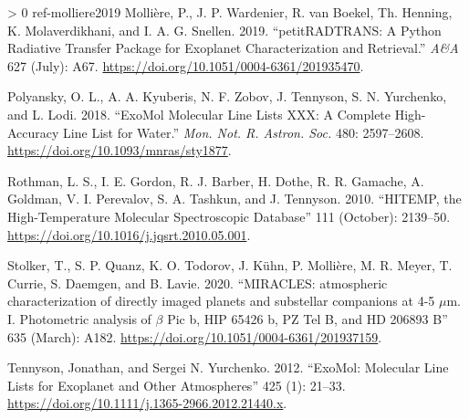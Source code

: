 \documentclass[10pt,a4paper,onecolumn]{article}
\newlength{\cslhangindent}
\newenvironment{CSLReferences}[3] %
 {%
  \setlength{\parindent}{0pt}
  \ifodd #1 \everypar{\setlength{\hangindent}{\cslhangindent}}\ignorespaces\fi
  \ifnum #2 > 0
  \setlength{\parskip}{#2\baselineskip}
  \fi
 }%
 {}
\begin{document}
\begin{CSLReferences}{1}{0}
\hypertarget{ref-molliere2019}{}%
Mollière, P., J. P. Wardenier, R. van Boekel, Th. Henning, K.
Molaverdikhani, and I. A. G. Snellen. 2019. {``{petitRADTRANS}: {A}
{Python} Radiative Transfer Package for Exoplanet Characterization and
Retrieval.''} \emph{A\&A} 627 (July): A67.
\url{https://doi.org/10.1051/0004-6361/201935470}.

\hypertarget{ref-polyansky2018}{}%
Polyansky, O. L., A. A. Kyuberis, N. F. Zobov, J. Tennyson, S. N.
Yurchenko, and L. Lodi. 2018. {``{ExoMol} Molecular Line Lists {XXX}: A
Complete High-Accuracy Line List for Water.''} \emph{Mon. Not. R.
Astron. Soc.} 480: 2597--2608.
\url{https://doi.org/10.1093/mnras/sty1877}.

\hypertarget{ref-rothman2010}{}%
Rothman, L. S., I. E. Gordon, R. J. Barber, H. Dothe, R. R. Gamache, A.
Goldman, V. I. Perevalov, S. A. Tashkun, and J. Tennyson. 2010.
{``{HITEMP}, the High-Temperature Molecular Spectroscopic Database''}
111 (October): 2139--50.
\url{https://doi.org/10.1016/j.jqsrt.2010.05.001}.

\hypertarget{ref-stolker2020}{}%
Stolker, T., S. P. Quanz, K. O. Todorov, J. Kühn, P. Mollière, M. R.
Meyer, T. Currie, S. Daemgen, and B. Lavie. 2020. {``{MIRACLES:
atmospheric characterization of directly imaged planets and substellar
companions at 4-5 {\(\mu\)}m. I. Photometric analysis of {\(\beta\)} Pic
b, HIP 65426 b, PZ Tel B, and HD 206893 B}''} 635 (March): A182.
\url{https://doi.org/10.1051/0004-6361/201937159}.

\hypertarget{ref-tennyson2012}{}%
Tennyson, Jonathan, and Sergei N. Yurchenko. 2012. {``{ExoMol}:
Molecular Line Lists for Exoplanet and Other Atmospheres''} 425 (1):
21--33. \url{https://doi.org/10.1111/j.1365-2966.2012.21440.x}.

\end{CSLReferences}
\end{document}
